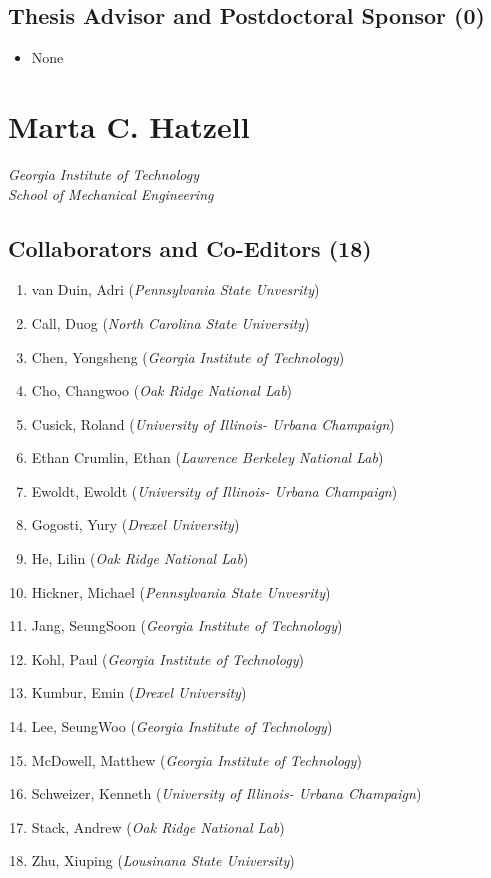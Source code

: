 \subsection{Thesis Advisor and Postdoctoral Sponsor
(0)}\label{thesis-advisor-and-postdoctoral-sponsor-0}

\begin{itemize}
\itemsep1pt\parskip0pt
\item
  None
\end{itemize}


\section{Marta C. Hatzell}

\emph{Georgia Institute of Technology}\\\emph{School of Mechanical Engineering}

\subsection{Collaborators and Co-Editors
(18)}\label{collaborators-and-co-editors-18}

\begin{enumerate}
\def\labelenumi{\arabic{enumi}.}
\itemsep1pt\parskip0pt
\item
  van Duin, Adri (\emph{Pennsylvania State Unvesrity})
\item
  Call, Duog (\emph{North Carolina State University})
\item
  Chen, Yongsheng (\emph{Georgia Institute of Technology})
\item
  Cho, Changwoo (\emph{Oak Ridge National Lab})
\item
  Cusick, Roland (\emph{University of Illinois- Urbana Champaign})
\item
  Ethan Crumlin, Ethan (\emph{Lawrence Berkeley National Lab})
\item
  Ewoldt, Ewoldt (\emph{University of Illinois- Urbana Champaign})
\item
  Gogosti, Yury (\emph{Drexel University})
\item
  He, Lilin (\emph{Oak Ridge National Lab})
\item
  Hickner, Michael (\emph{Pennsylvania State Unvesrity})
\item
  Jang, SeungSoon (\emph{Georgia Institute of Technology})
\item
  Kohl, Paul (\emph{Georgia Institute of Technology})
\item
  Kumbur, Emin (\emph{Drexel University})
\item
  Lee, SeungWoo (\emph{Georgia Institute of Technology})
\item
  McDowell, Matthew (\emph{Georgia Institute of Technology})
\item
  Schweizer, Kenneth (\emph{University of Illinois- Urbana Champaign})
\item
  Stack, Andrew (\emph{Oak Ridge National Lab})
\item
  Zhu, Xiuping (\emph{Lousinana State University})
\end{enumerate}

